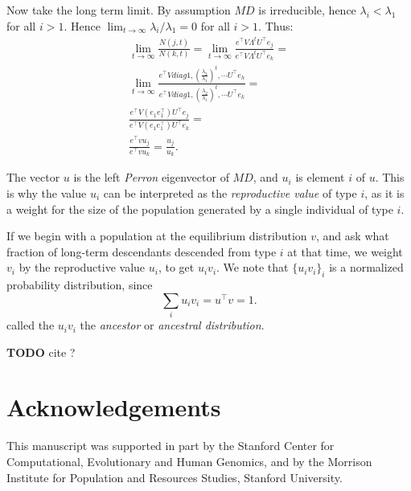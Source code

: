 \documentclass[a4paper,twocolumn]{article}   	%
\newcommand*{\tr}{^\intercal}
\newcommand{\goesto}{\rightarrow}
\newcommand{\dspfrac}[2]{\frac{\displaystyle #1}{\displaystyle #2} }
\begin{document}
Now take the long term limit.
By assumption $MD$ is irreducible,
hence $\lambda_i < \lambda_1$ for all $i > 1$.
Hence $\lim_{t \goesto \infty} \lambda_i / \lambda_1 = 0$ for all $i > 1$.
Thus:
\begin{multline*}
\lim_{t \goesto \infty}\frac{N(j,t)}{N(k,t)} =
\lim_{t \goesto \infty} \frac{ e\tr V \Lambda^t U\tr e_j}{ e\tr V \Lambda^t U\tr e_k} = \\
\lim_{t \goesto \infty} \frac{ e\tr V diag {1, (\dspfrac{\lambda_2}{\lambda_1})^t, \cdots} U\tr e_h} { e\tr V diag {1,(\dspfrac{\lambda_2}{\lambda_1})^t, \cdots} U\tr e_k} = \\
\frac{e\tr V (e_1 e_1\tr) U\tr e_j} { e\tr V (e_1 e_1\tr) U\tr e_k} = \\
\frac{ e\tr v u_j} { e\tr v  u_k} =
\frac{u_j} {u_k}.
\end{multline*}

The vector $u$ is the left \emph{Perron} eigenvector of $MD$, and $u_i$ is element $i$ of $u$.
This is why the value $u_i$ can be interpreted as the \emph{reproductive value} of type $i$, as it is a weight for the size of the population generated by a single individual of type $i$.

If we begin with a population at the equilibrium distribution $v$,
and ask what fraction of long-term descendants descended from type $i$ at that time,
we weight $v_i$ by the reproductive value $u_i$, to get $u_i v_i$.
We note that $\{u_i v_i\}_{i}$ is a normalized probability distribution, since
$$
\sum_i {u_i v_i} = u\tr v = 1.
$$ 
\citet{Hermisson2002} called the $u_i v_i$ the \emph{ancestor} or \emph{ancestral distribution}.

\textbf{TODO} cite \citep{Grafen2006}?

{\small
\section*{Acknowledgements}

This manuscript was supported in part by the Stanford Center for Computational, Evolutionary and Human Genomics, and by the Morrison Institute for Population and Resources Studies, Stanford University.
}



\end{document}
